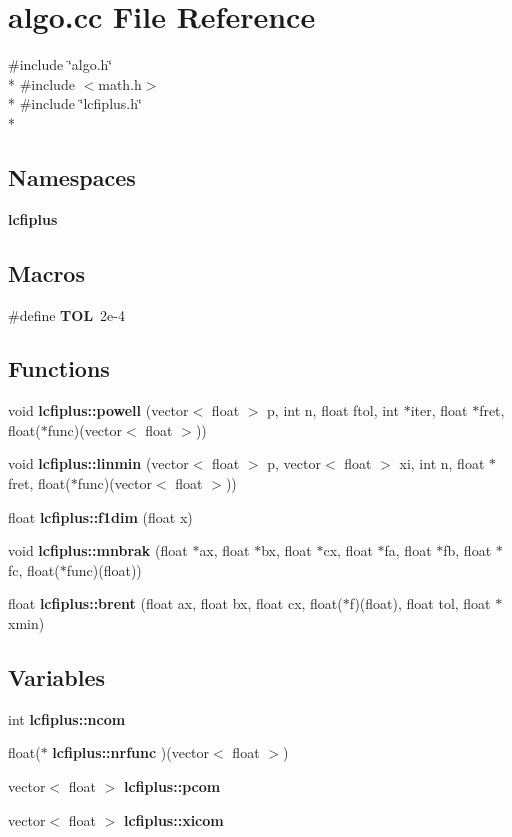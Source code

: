 \section{algo.\-cc File Reference}
\label{algo_8cc}
{\ttfamily \#include \char`\"{}algo.\-h\char`\"{}}\\*
{\ttfamily \#include $<$math.\-h$>$}\\*
{\ttfamily \#include \char`\"{}lcfiplus.\-h\char`\"{}}\\*
\subsection*{Namespaces}
\begin{DoxyCompactItemize}
\item 
{\bf lcfiplus}
\end{DoxyCompactItemize}
\subsection*{Macros}
\begin{DoxyCompactItemize}
\item 
\#define {\bf T\-O\-L}~2e-\/4
\end{DoxyCompactItemize}
\subsection*{Functions}
\begin{DoxyCompactItemize}
\item 
void {\bf lcfiplus\-::powell} (vector$<$ float $>$ p, int n, float ftol, int $\ast$iter, float $\ast$fret, float($\ast$func)(vector$<$ float $>$))
\item 
void {\bf lcfiplus\-::linmin} (vector$<$ float $>$ p, vector$<$ float $>$ xi, int n, float $\ast$fret, float($\ast$func)(vector$<$ float $>$))
\item 
float {\bf lcfiplus\-::f1dim} (float x)
\item 
void {\bf lcfiplus\-::mnbrak} (float $\ast$ax, float $\ast$bx, float $\ast$cx, float $\ast$fa, float $\ast$fb, float $\ast$fc, float($\ast$func)(float))
\item 
float {\bf lcfiplus\-::brent} (float ax, float bx, float cx, float($\ast$f)(float), float tol, float $\ast$xmin)
\end{DoxyCompactItemize}
\subsection*{Variables}
\begin{DoxyCompactItemize}
\item 
int {\bf lcfiplus\-::ncom}
\item 
float($\ast$ {\bf lcfiplus\-::nrfunc} )(vector$<$ float $>$)
\item 
vector$<$ float $>$ {\bf lcfiplus\-::pcom}
\item 
vector$<$ float $>$ {\bf lcfiplus\-::xicom}
\end{DoxyCompactItemize}


